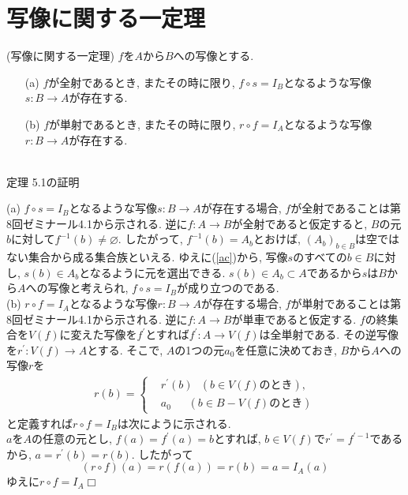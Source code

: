 \documentclass[a4j]{jsarticle}
\def \QED{\hfill $\Box$}%
\begin{document}
\section{写像に関する一定理}

\begin{itembox}[l]{ (写像に関する一定理)}
	$f$を$A$から$B$への写像とする.
	\begin{itemize}
		\item[(a)] $f$が全射であるとき, またその時に限り, $f \circ s = I_B$となるような写像$s : B \rightarrow A$が存在する.
		\item[(b)] $f$が単射であるとき, またその時に限り, $r \circ f = I_A$となるような写像$r : B \rightarrow A$が存在する.
	\end{itemize}
\end{itembox}\\

 定理 5.1の証明

(a) $f \circ s = I_B$となるような写像$s : B \rightarrow A$が存在する場合, $f$が全射であることは第8回ゼミナール4.1から示される. 逆に$f : A \rightarrow B$が全射であると仮定すると, $B$の元$b$に対して$f^{-1}(b) \neq \varnothing$. したがって, $f^{-1}(b) = A_b$とおけば, $(A_b)_{b \in B}$は空ではない集合から成る集合族といえる. ゆえに(\ref{ac})から, 写像$s$のすべての$b \in B$に対し, $s(b) \in A_b$となるように元を選出できる. $s(b) \in A_b \subset A$であるから$s$は$B$から$A$への写像と考えられ, $f \circ s = I_B$が成り立つのである. \\

(b) $r \circ f = I_A$となるような写像$r : B \rightarrow A$が存在する場合, $f$が単射であることは第8回ゼミナール4.1から示される. 逆に$f : A \rightarrow B$が単車であると仮定する. $f$の終集合を$V(f)$に変えた写像を$f^\prime$とすれば$f^\prime : A \rightarrow V(f)$は全単射である. その逆写像を$r^\prime : V(f) \rightarrow A$とする. そこで, $A$の1つの元$a_0$を任意に決めておき, $B$から$A$への写像$r$を
\begin{align*}
	r(b) =  \begin{cases}
		 & r^\prime(b)\:\:\:(b \in V(f)\mbox{のとき}),    \\
		 & a_0\:\:\:\:\:\:\:(b \in B - V(f)\mbox{のとき})
	\end{cases}
\end{align*}
と定義すれば$r \circ f = I_B$は次にように示される. \\
$a$を$A$の任意の元とし, $f(a)=f^\prime(a)=b$とすれば, $b \in V(f)$で$r^\prime = f^{\prime-1}$であるから, $a=r^\prime(b)=r(b)$. したがって$$(r \circ f)(a) = r(f(a)) = r(b) = a = I_A(a)$$ゆえに$r \circ f = I_A$\QED\\
\end{document}
